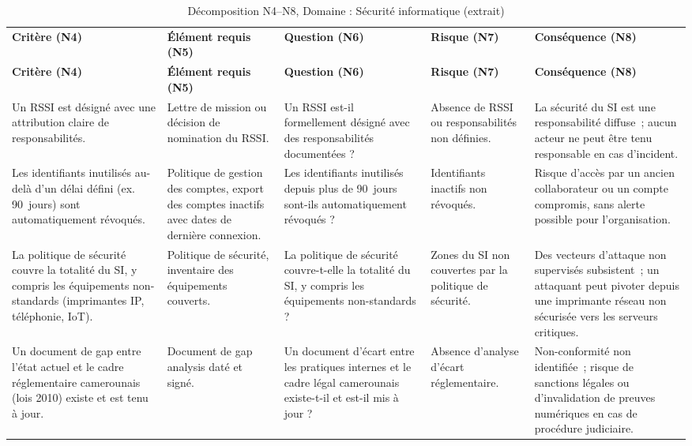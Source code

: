 \begin{longtable}{p{2.3cm}p{2.3cm}p{2.1cm}p{2.0cm}p{2.3cm}}
\small
\caption{Décomposition N4--N8, Domaine : Sécurité informatique (extrait)} \\
\toprule
\textbf{Critère (N4)} & \textbf{Élément requis (N5)} & \textbf{Question (N6)} & \textbf{Risque (N7)} & \textbf{Conséquence (N8)} \\
\midrule
\endfirsthead
\toprule
\textbf{Critère (N4)} & \textbf{Élément requis (N5)} & \textbf{Question (N6)} & \textbf{Risque (N7)} & \textbf{Conséquence (N8)} \\
\midrule
\endhead
\bottomrule
\endlastfoot

Un RSSI est désigné avec une attribution claire de responsabilités. &
Lettre de mission ou décision de nomination du RSSI. &
Un RSSI est-il formellement désigné avec des responsabilités documentées ? &
Absence de RSSI ou responsabilités non définies. &
La sécurité du SI est une responsabilité diffuse~; aucun acteur ne peut être tenu responsable en cas d'incident. \\
\addlinespace

Les identifiants inutilisés au-delà d'un délai défini (ex. 90~jours) sont automatiquement révoqués. &
Politique de gestion des comptes, export des comptes inactifs avec dates de dernière connexion. &
Les identifiants inutilisés depuis plus de 90~jours sont-ils automatiquement révoqués ? &
Identifiants inactifs non révoqués. &
Risque d'accès par un ancien collaborateur ou un compte compromis, sans alerte possible pour l'organisation. \\
\addlinespace

La politique de sécurité couvre la totalité du SI, y compris les équipements non-standards (imprimantes IP, téléphonie, IoT). &
Politique de sécurité, inventaire des équipements couverts. &
La politique de sécurité couvre-t-elle la totalité du SI, y compris les équipements non-standards ? &
Zones du SI non couvertes par la politique de sécurité. &
Des vecteurs d'attaque non supervisés subsistent~; un attaquant peut pivoter depuis une imprimante réseau non sécurisée vers les serveurs critiques. \\
\addlinespace

Un document de gap entre l'état actuel et le cadre réglementaire camerounais (lois 2010) existe et est tenu à jour. &
Document de gap analysis daté et signé. &
Un document d'écart entre les pratiques internes et le cadre légal camerounais existe-t-il et est-il mis à jour ? &
Absence d'analyse d'écart réglementaire. &
Non-conformité non identifiée~; risque de sanctions légales ou d'invalidation de preuves numériques en cas de procédure judiciaire. \\

\end{longtable}


